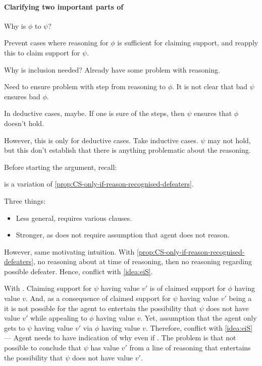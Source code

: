 \paragraph{Clarifying two important parts of \nI{}}

\begin{note}
  Why is \(\phi\) to \(\psi\)?

  Prevent cases where reasoning for \(\phi\) is sufficient for claiming support, and reapply this to claim support for \(\psi\).
\end{note}


\begin{note}
  Why is inclusion needed?
  Already have some problem with reasoning.

  Need to ensure problem with step from reasoning to \(\phi\).
  It is not clear that bad \(\psi\) ensures bad \(\phi\).

  In deductive cases, maybe.
  If one is sure of the steps, then \(\psi\) ensures that \(\phi\) doesn't hold.

  However, this is only for deductive cases.
  Take inductive cases.
  \(\psi\) may not hold, but this don't establish that there is anything problematic about the reasoning.
\end{note}




\newpage

\begin{note}
  Before starting the argument, recall:
  \begin{quote}
    \vspace{-\baselineskip}
    \propRecogniseDefeaters*
  \end{quote}
  \nI{} is a variation of \autoref{prop:CS-only-if-reason-recognised-defeaters}.

  Three things:
  \begin{itemize}
  \item Less general, requires various clauses.
  \item Stronger, as does not require assumption that agent does not reason.
  \end{itemize}

  However, same motivating intuition.
  With \autoref{prop:CS-only-if-reason-recognised-defeaters}, no reasoning about \requ{} at time of reasoning, then no reasoning regarding possible defeater.
  Hence, conflict with \autoref{idea:eiS}.

  With \nI{}.
  Claiming support for \(\psi\) having value \(v'\) is \requ{} of claimed support for \(\phi\) having value \(v\).
  And, as a consequence of claimed support for \(\psi\) having value \(v'\) being a \requ{} it is not possible for the agent to entertain the possibility that \(\psi\) does not have value \(v'\) while appealing to \(\phi\) having value \(v\).
  Yet, assumption that the agent only gets to \(\psi\) having value \(v'\) via \(\phi\) having value \(v\).
  Therefore, conflict with \autoref{idea:eiS} --- Agent needs to have indication of why even if \mom{}.
  The problem is that not possible to conclude that \(\psi\) has value \(v'\) from a line of reasoning that entertains the possibility that \(\psi\) does not have value \(v'\).
\end{note}

